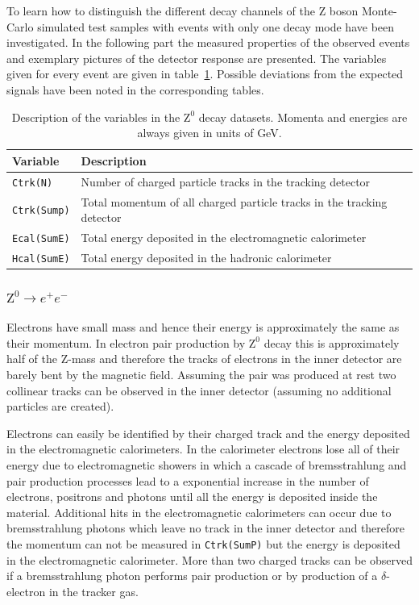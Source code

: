 \documentclass[11pt, a4paper]{article}
\numberwithin{equation}{section}
\begin{document}
To learn how to distinguish the different decay channels of the Z boson Monte-Carlo simulated test samples with events with only one decay mode have been investigated.
In the following part the measured properties of the observed events and exemplary pictures of the detector response are presented.
The variables given for every event are given in table~\ref{tab:desc_variables_tag1}.
Possible deviations from the expected signals have been noted in the corresponding tables.
\begin{table}[H]
	\centering
	\begin{tabularx}{0.9\textwidth}{lX}
		\toprule
		\textbf{Variable} & \textbf{Description} \\
		\midrule		
		\texttt{Ctrk(N)} 	& Number of charged particle tracks in the tracking detector \\
		\texttt{Ctrk(Sump)} 	& Total momentum of all charged particle tracks in the tracking detector \\
		\texttt{Ecal(SumE)}	& Total energy deposited in the electromagnetic calorimeter \\
		\texttt{Hcal(SumE)}	& Total energy deposited in the hadronic calorimeter \\
		\bottomrule
	\end{tabularx}
	\caption{Description of the variables in the $\mathrm{Z}^0$ decay datasets. Momenta and energies are always given in units of GeV.}
	\label{tab:desc_variables_tag1}
\end{table}

\clearpage
\subsubsection{$\mathrm{Z}^0\rightarrow e^+e^-$}
Electrons have small mass and hence their energy is approximately the same as their momentum.
In electron pair production by $\mathrm{Z}^0$ decay this is approximately half of the Z-mass and therefore the tracks of electrons in the inner detector are barely bent by the magnetic field.
Assuming the pair was produced at rest two collinear tracks can be observed in the inner detector (assuming no additional particles are created).

Electrons can easily be identified by their charged track and the energy deposited in the electromagnetic calorimeters.
In the calorimeter electrons lose all of their energy due to electromagnetic showers in which a cascade of bremsstrahlung and pair production processes lead to a exponential increase in the number of electrons, positrons and photons until all the energy is deposited inside the material.
Additional hits in the electromagnetic calorimeters can occur due to bremsstrahlung photons which leave no track in the inner detector and therefore the momentum can not be measured in \texttt{Ctrk(SumP)} but the energy is deposited in the electromagnetic calorimeter.
More than two charged tracks can be observed if a bremsstrahlung photon performs pair production or by production of a $\delta$-electron in the tracker gas.
\end{document}
